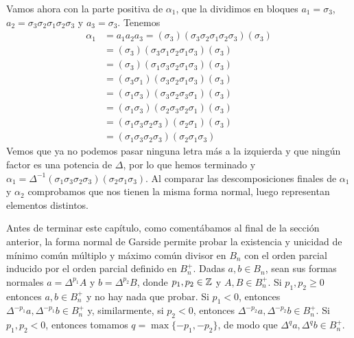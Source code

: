 \documentclass[TFG.tex]{subfiles}
\begin{document}
\begin{ej}
Vamos ahora con la parte positiva de $\alpha_1$, que la dividimos en bloques $a_1=\sigma_3$, $a_2=\sigma_3\sigma_2\sigma_1\sigma_2\sigma_3$ y $a_3=\sigma_3$. Tenemos
\begin{align*}
\alpha_1&=a_1a_2a_3=(\sigma_3)(\sigma_3\sigma_2\sigma_1\sigma_2\sigma_3)(\sigma_3)\\
&=(\sigma_3)(\sigma_3\sigma_1\sigma_2\sigma_1\sigma_3)(\sigma_3)\\
&=(\sigma_3)(\sigma_1\sigma_3\sigma_2\sigma_1\sigma_3)(\sigma_3)\\
&=(\sigma_3\sigma_1)(\sigma_3\sigma_2\sigma_1\sigma_3)(\sigma_3)\\
&=(\sigma_1\sigma_3)(\sigma_3\sigma_2\sigma_3\sigma_1)(\sigma_3)\\
&=(\sigma_1\sigma_3)(\sigma_2\sigma_3\sigma_2\sigma_1)(\sigma_3)\\
&=(\sigma_1\sigma_3\sigma_2\sigma_3)(\sigma_2\sigma_1)(\sigma_3)\\
&=(\sigma_1\sigma_3\sigma_2\sigma_3)(\sigma_2\sigma_1\sigma_3)
\end{align*}
Vemos que ya no podemos pasar ninguna letra más a la izquierda y que ningún factor es una potencia de $\Delta$, por lo que hemos terminado y $\alpha_1=\Delta^{-1}(\sigma_1\sigma_3\sigma_2\sigma_3)(\sigma_2\sigma_1\sigma_3)$. Al comparar las descomposiciones finales de $\alpha_1$ y $\alpha_2$ comprobamos que nos tienen la misma forma normal, luego representan elementos distintos.
\end{ej}

Antes de terminar este capítulo, como comentábamos al final de la sección anterior, la forma normal de Garside permite probar la existencia y unicidad de mínimo común múltiplo y máximo común divisor en $B_n$ con el orden parcial inducido por el orden parcial definido en $B_n^+$.  Dadas $a,b\in B_n$, sean sus formas normales $a=\Delta^{p_1}A$ y $b=\Delta^{p_2}B$, donde $p_1,p_2\in\mathbb{Z}$ y $A,B\in B_n^+$. Si $p_1,p_2\geq 0$ entonces $a,b\in B_n^+$ y no hay nada que probar. Si $p_1< 0$, entonces $\Delta^{-p_1}a, \Delta^{-p_1}b\in B_n^+$ y, similarmente, si $p_2<0$, entonces $\Delta^{-p_2}a, \Delta^{-p_2}b\in B_n^+$. Si  $p_1,p_2<0$, entonces tomamos $q=\max\{-p_1,-p_2\}$, de modo que $\Delta^{q}a, \Delta^{q}b\in B_n^+$. 
\end{document}
